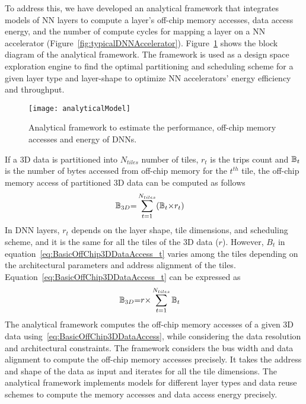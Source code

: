 To address this, we have developed an analytical framework that integrates models of NN layers to compute a layer's off-chip memory accesses, data access energy, and the number of compute cycles for mapping a layer on a NN accelerator (Figure~\ref{fig:typicalDNNAccelerator}). Figure~\ref{fig:analyticalModel} shows the block diagram of the analytical framework. The framework is used as a design space exploration engine to find the optimal partitioning and scheduling scheme for a given layer type and layer-shape to optimize NN accelerators' energy efficiency and throughput. 
\begin{figure}[!htb]
	\centering
    \captionsetup{font=sf}	
	\texttt{[image: analyticalModel]}
	\caption{Analytical framework to estimate the performance, off-chip memory accesses and energy of DNNs.}
	\label{fig:analyticalModel}
\end{figure}

If a 3D data is partitioned into $N_{tiles}$ number of tiles, $r_t$ is the trips count and $\mathbb{B}_{t}$ is the number of bytes accessed from off-chip memory for the $t^{th}$ tile, the off-chip memory access of partitioned 3D data can be computed as follows
\begin{align}\label{eq:BasicOffChip3DDataAccess_t}
	\mathbb{B}_{3D}&{=}\sum_{t=1}^{N_{tiles}}(\mathbb{B}_{t}{\times}r_t)
\end{align}
In DNN layers, $r_t$ depends on the layer shape, tile dimensions, and scheduling scheme, and it is the same for all the tiles of the 3D data ($r$). However, $B_t$ in equation~\ref{eq:BasicOffChip3DDataAccess_t} varies among the tiles depending on the architectural parameters and address alignment of the tiles. Equation~\ref{eq:BasicOffChip3DDataAccess_t} can be expressed as 
\begin{align}\label{eq:BasicOffChip3DDataAccess}
	\mathbb{B}_{3D}&{=}r{\times}\sum_{t=1}^{N_{tiles}}\mathbb{B}_{t}
\end{align}
The analytical framework computes the off-chip memory accesses of a given 3D data using~\eqref{eq:BasicOffChip3DDataAccess}, while considering the data resolution and architectural constraints. The framework considers the bus width and data alignment to compute the off-chip memory accesses precisely. It takes the address and shape of the data as input and iterates for all the tile dimensions. The analytical framework implements models for different layer types and data reuse schemes to compute the memory accesses and data access energy precisely. 

